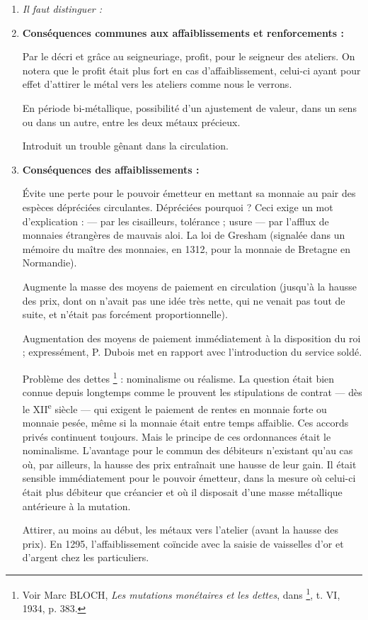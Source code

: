 \documentclass[french,twoside]{book} %
\newlength{\listmod}
\newcommand{\listhead}[1]{\hspace{-1\listmod}\emph{#1}}
\begin{document}
\begin{enumerate}[itemsep=\baselineskip,]
\item[]\listhead{Il faut distinguer :}
\item {\bfseries Conséquences communes aux affaiblissements et renforcements :}\par
Par le décri et grâce au seigneuriage, profit, pour le seigneur des ateliers. On notera que le profit était plus fort en cas d’affaiblissement, celui-ci ayant pour effet d’attirer le métal vers les ateliers comme nous le verrons.\par
En période bi-métallique, possibilité d’un ajustement de valeur, dans un sens ou dans un autre, entre les deux métaux précieux.\par
Introduit un trouble gênant dans la circulation.  
\label{p93}

\item {\bfseries Conséquences des affaiblissements :}\par
Évite une perte pour le pouvoir émetteur en mettant sa monnaie au pair des espèces dépréciées circulantes. Dépréciées pourquoi ? Ceci exige un mot d’explication : — par les cisailleurs, tolérance ; usure — par l’afflux de monnaies étrangères de mauvais aloi. La loi de Gresham (signalée dans un mémoire du maître des monnaies, en 1312, pour la monnaie de Bretagne en Normandie).\par
Augmente la masse des moyens de paiement en circulation (jusqu’à la hausse des prix, dont on n’avait pas une idée très nette, qui ne venait pas tout de suite, et n’était pas forcément proportionnelle).\par
Augmentation des moyens de paiement immédiatement à la disposition du roi ; expressément, P. Dubois met en rapport avec l’introduction du service soldé.\par
Problème des dettes \footnote{ Voir Marc BLOCH, {\itshape Les mutations monétaires et les dettes}, dans \href{http://gallica.bnf.fr/document?O=N010027}{}\footnote{\href{http://gallica.bnf.fr/document?O=N010027}{http://gallica.bnf.fr/document?O=N010027}}, t. VI, 1934, p. 383.} : nominalisme ou réalisme. La question était bien connue depuis longtemps comme le prouvent les stipulations de contrat — dès le XII\textsuperscript{e} siècle — qui exigent le paiement de rentes en monnaie forte ou monnaie pesée, même si la monnaie était entre temps affaiblie. Ces accords privés continuent toujours. Mais le principe de ces ordonnances était le nominalisme. L’avantage pour le commun des débiteurs n’existant qu’au cas où, par ailleurs, la hausse des prix entraînait une hausse de leur gain. Il était sensible immédiatement pour le pouvoir émetteur, dans la mesure où celui-ci était plus débiteur que créancier et où il disposait d’une masse métallique antérieure à la mutation.\par
Attirer, au moins au début, les métaux vers l’atelier (avant la hausse des prix). En 1295, l’affaiblissement coïncide avec la saisie de vaisselles d’or et d’argent chez les particuliers.


\end{enumerate}
\end{document}
